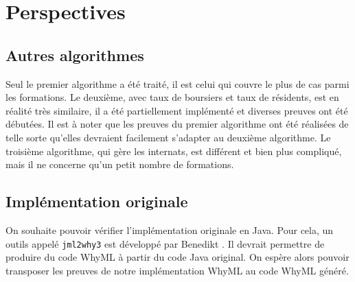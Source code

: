 \section{Perspectives}

  \subsection{Autres algorithmes}

    Seul le premier algorithme a été traité, il est celui qui couvre le plus de cas parmi les formations. Le deuxième, avec taux de boursiers et taux de résidents, est en réalité très similaire, il a été partiellement implémenté et diverses preuves ont été débutées. Il est à noter que les preuves du premier algorithme ont été réalisées de telle sorte qu'elles devraient facilement s'adapter au deuxième algorithme. Le troisième algorithme, qui gère les internats, est différent et bien plus compliqué, mais il ne concerne qu'un petit nombre de formations.

  \subsection{Implémentation originale}

    On souhaite pouvoir vérifier l'implémentation originale en Java. Pour cela, un outils appelé \texttt{jml2why3} est développé par Benedikt . Il devrait permettre de produire du code WhyML à partir du code Java original. On espère alors pouvoir transposer les preuves de notre implémentation WhyML au code WhyML généré.
